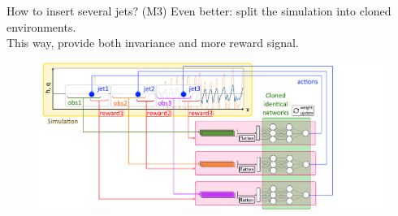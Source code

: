 \documentclass{beamer}
\begin{document}
\begin{frame}{How to insert several jets? (M3)}
Even better: split the simulation into cloned environments. \\

This way, provide both invariance and more reward signal. \\

  \begin{figure}
    \begin{center}
      \includegraphics[width=.98\textwidth]{Figures/graph_multienv_final}
    \end{center}
    \end{figure}
\end{frame}
\end{document}
